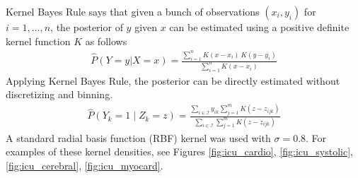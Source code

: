 Kernel Bayes Rule says that given a bunch of observations $(x_i, y_i)$ for $i = 1, \dots, n$, the posterior of $y$ given $x$ can be estimated using a positive definite kernel function $K$ as follows
\begin{gather}
    \hat{P}(Y = y | X = x) = \frac
        {\sum_{i=1}^n K(x - x_i) \ K(y - y_i)}
        {\sum_{i=1}^n K(x - x_i)}
\end{gather}
Applying Kernel Bayes Rule, the posterior can be directly estimated without discretizing and binning.
\begin{gather}
    \hat{P}(Y_k = 1 \mid Z_k = z) = \frac
        {\sum_{i \in \mathcal{I}} y_{ik} \sum_{j=1}^m K(z - z_{ijk})}
        {\sum_{i \in \mathcal{I}} \sum_{j=1}^m K(z - z_{ijk})}
\end{gather}
A standard radial basis function (RBF) kernel was used with $\sigma = 0.8$.  For examples of these kernel densities, see Figures \ref{fig:icu_cardio}, \ref{fig:icu_systolic}, \ref{fig:icu_cerebral}, \ref{fig:icu_myocard}.

